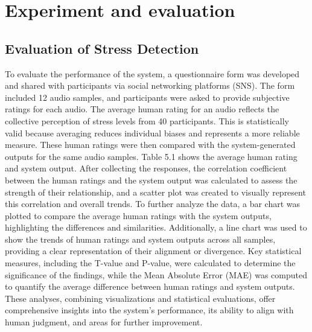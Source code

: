 \documentclass[Arial,12pt,openright,twoside]{book}
\begin{document}
\chapter{Experiment and evaluation}
\clearpage 
  \section{Evaluation of Stress Detection}
  To evaluate the performance of the system, a questionnaire form was developed and shared with participants via social networking platforms (SNS). The form included 12 audio samples, and participants were asked to provide subjective ratings for each audio. The average human rating for an audio reflects the collective perception of stress levels from 40 participants. This is statistically valid because averaging reduces individual biases and represents a more reliable measure. These human ratings were then compared with the system-generated outputs for the same audio samples. Table 5.1 shows the average human rating and system output. After collecting the responses, the correlation coefficient between the human ratings and the system output was calculated to assess the strength of their relationship, and a scatter plot was created to visually represent this correlation and overall trends. To further analyze the data, a bar chart was plotted to compare the average human ratings with the system outputs, highlighting the differences and similarities. Additionally, a line chart was used to show the trends of human ratings and system outputs across all samples, providing a clear representation of their alignment or divergence. Key statistical measures, including the T-value and P-value, were calculated to determine the significance of the findings, while the Mean Absolute Error (MAE) was computed to quantify the average difference between human ratings and system outputs. These analyses, combining visualizations and statistical evaluations, offer comprehensive insights into the system’s performance, its ability to align with human judgment, and areas for further improvement. 
\end{document}

